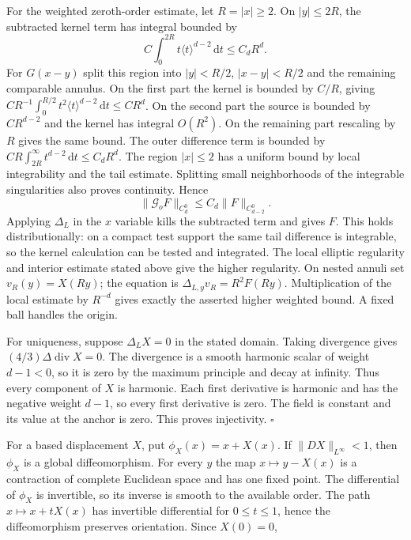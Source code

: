 \documentclass[
  english,
  11pt,
  reqno]{amsart}
\begin{document}
For the weighted zeroth-order estimate, let \(R=|x|\ge2\). On
\(|y|\le2R\), the subtracted kernel term has integral bounded by \[
C\int_0^{2R}t\langle t\rangle^{d-2}\,\mathrm dt
\le C_dR^d.
\] For \(G(x-y)\) split this region into \(|y|<R/2\), \(|x-y|<R/2\) and
the remaining comparable annulus. On the first part the kernel is
bounded by \(C/R\), giving
\(CR^{-1}\int_0^{R/2}t^2\langle t\rangle^{d-2}\,\mathrm dt\le CR^d\). On
the second part the source is bounded by \(CR^{d-2}\) and the kernel has
integral \(O(R^2)\). On the remaining part rescaling by \(R\) gives the
same bound. The outer difference term is bounded by
\(CR\int_{2R}^{\infty}t^{d-2}\,\mathrm dt\le C_dR^d\). The region
\(|x|\le2\) has a uniform bound by local integrability and the tail
estimate. Splitting small neighborhoods of the integrable singularities
also proves continuity. Hence \[
\|\mathcal G_oF\|_{C^0_d}\le C_d\|F\|_{C^0_{d-2}}.
\] Applying \(\Delta_L\) in the \(x\) variable kills the subtracted term
and gives \(F\). This holds distributionally: on a compact test support
the same tail difference is integrable, so the kernel calculation can be
tested and integrated. The local elliptic regularity and interior
estimate stated above give the higher regularity. On nested annuli set
\(v_R(y)=X(Ry)\); the equation is \(\Delta_{L,y}v_R=R^2F(Ry)\).
Multiplication of the local estimate by \(R^{-d}\) gives exactly the
asserted higher weighted bound. A fixed ball handles the origin.

For uniqueness, suppose \(\Delta_LX=0\) in the stated domain. Taking
divergence gives \((4/3)\Delta\operatorname{div}X=0\). The divergence is
a smooth harmonic scalar of weight \(d-1<0\), so it is zero by the
maximum principle and decay at infinity. Thus every component of \(X\)
is harmonic. Each first derivative is harmonic and has the negative
weight \(d-1\), so every first derivative is zero. The field is constant
and its value at the anchor is zero. This proves injectivity.
\hfill\(\square\)

For a based displacement \(X\), put \(\phi_X(x)=x+X(x)\). If
\(\|DX\|_{L^\infty}<1\), then \(\phi_X\) is a global diffeomorphism. For
every \(y\) the map \(x\mapsto y-X(x)\) is a contraction of complete
Euclidean space and has one fixed point. The differential of \(\phi_X\)
is invertible, so its inverse is smooth to the available order. The path
\(x\mapsto x+tX(x)\) has invertible differential for \(0\le t\le1\),
hence the diffeomorphism preserves orientation. Since \(X(0)=0\),
\end{document}
